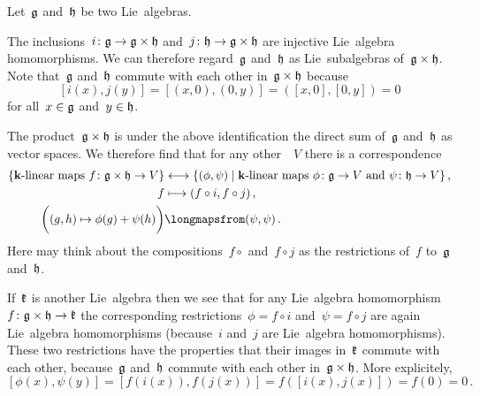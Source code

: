 \begin{example}
  \label{homomorphism out of a product}
  Let~$\mathfrak{g}$ and~$\mathfrak{h}$ be two Lie~algebras.
  
  The inclusions~$i \colon \mathfrak{g} \to \mathfrak{g} \times \mathfrak{h}$ and~$j \colon \mathfrak{h} \to \mathfrak{g} \times \mathfrak{h}$ are injective Lie~algebra homomorphisms.
  We can therefore regard~$\mathfrak{g}$ and~$\mathfrak{h}$ as Lie~subalgebras of~$\mathfrak{g} \times \mathfrak{h}$.
  Note that~$\mathfrak{g}$ and~$\mathfrak{h}$ commute with each other in~$\mathfrak{g} \times \mathfrak{h}$ because
  \[
    [i(x), j(y)]
    =
    [(x,0), (0,y)]
    =
    ( [x,0], [0,y] )
    =
    0
  \]
  for all~$x \in \mathfrak{g}$ and~$y \in \mathfrak{h}$.

  The product~$\mathfrak{g} \times \mathfrak{h}$ is under the above identification the direct sum of~$\mathfrak{g}$ and~$\mathfrak{h}$ as vector spaces.
  We therefore find that for any other~{\vectorspace{$\kf$}}~$V$ there is a {\onetoone} correspondence
  \begin{align*}
    \{ \text{{\linear{$\kf$}} maps~$f \colon \glie \times \hlie \to V$} \}
    &\longonetoone
    \{
      (\phi, \psi)
    \suchthat
      \text{{\linear{$\kf$}} maps~$\phi \colon \glie \to V$ and~$\psi \colon \hlie \to V$}
    \} \,,
    \\
    f
    &\longmapsto
    (f \circ i, f \circ j)  \,,
    \\
    \biggl( (g,h) \mapsto \phi(g) + \psi(h) \biggr)
    &\longmapsfrom
    (\psi, \psi)  \,.
  \end{align*}
  Here may think about the compositions~$f \circ $ and~$f \circ j$ as the restrictions of~$f$ to~$\mathfrak{g}$ and~$\mathfrak{h}$.
  
  If~$\mathfrak{k}$ is another Lie~algebra then we see that for any Lie~algebra homomorphism~$f \colon \mathfrak{g} \times \mathfrak{h} \to \mathfrak{k}$ the corresponding restrictions~$\phi = f \circ i$ and~$\psi = f \circ j$ are again Lie~algebra homomorphisms (because~$i$ and~$j$ are Lie~algebra homomorphisms).
  These two restrictions have the properties that their images in~$\mathfrak{k}$ commute with each other, because~$\mathfrak{g}$ and~$\mathfrak{h}$ commute with each other in~$\mathfrak{g} \times \mathfrak{h}$.
  More explicitely,
  \[
    [\phi(x), \psi(y)]
    =
    [f(i(x)), f(j(x))]
    =
    f( [i(x), j(x)] )
    =
    f( 0 )
    =
    0 \,.
  \]
  

\end{example}
